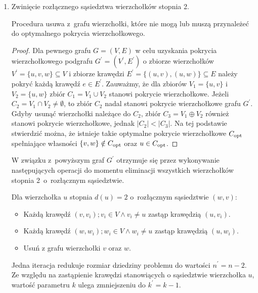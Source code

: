\begin{enumerate}
  \item Zwinięcie rozłącznego sąsiedztwa wierzchołków stopnia 2.
    \begin{theorem}
      Procedura usuwa z~grafu wierzchołki, które nie mogą lub muszą przynależeć do 
      optymalnego pokrycia wierzchołkowego.
    \end{theorem}
    \begin{proof}
      Dla pewnego grafu $G=(V,E)$ w celu uzyskania pokrycia wierzchołkowego podgrafu $G^\prime=(V^\prime,E^\prime)$ o zbiorze wierzchołków $V^\prime=\{u, v, w\} \subseteq V$ i zbiorze krawędzi $E^\prime=\{(u,v), (u,w)\} \subseteq E$ należy pokryć każdą krawędź $e \in E^\prime$. 
      Zauważmy, że dla zbiorów $V_1=\{u,v\}$ i $V_2=\{u,w\}$ zbiór $C_1=V_1 \cup V_2$ stanowi pokrycie wierzchołkowe.
      Jeżeli $C_2=V_1 \cap V_2 \neq \emptyset$, to zbiór $C_2$ nadal stanowi pokrycie wierzchołkowe grafu $G^\prime$.
      Gdyby usunąć wierzchołki należące do $C_2$, zbiór $C_3=V_1 \oplus V_2$ również stanowi pokrycie wierzchołkowe, jednak $|C_2| < |C_3|$.
      Na tej podstawie stwierdzić można, że istnieje takie optymalne pokrycie wierzchołkowe $C_{\textnormal{opt}}$ spełniające własności $\{v,w\} \notin C_{\textnormal{opt}}$ oraz $u \in C_{\textnormal{opt}}$.
    \end{proof}

    W związku z~powyższym graf $G^\prime$ otrzymuje się przez wykonywanie
    następujących operacji do momentu eliminacji wszystkich wierzchołków stopnia
    2\ o~rozłącznym sąsiedztwie.

    Dla wierzchołka $u$ stopnia $d(u)=2$ o~rozłącznym sąsiedztwie $(w,v)$:
    \begin{itemize}
      \item Każdą krawędź $(v,v_i); v_i \in V \land v_i \neq u$ zastąp 
        krawędzią $(u, v_i)$.
      \item Każdą krawędź $(w,w_i); w_i \in V \land w_i \neq u$ zastąp
        krawędzią $(u, w_i)$.
      \item Usuń z grafu wierzchołki $v$ oraz $w$.
    \end{itemize}
    Jedna iteracja redukuje rozmiar dziedziny problemu do wartości
    $n^\prime=n-2$.
    Ze względu na zastąpienie krawędzi stanowiących o sąsiedztwie wierzchołka $u$,
    wartość parametru $k$ ulega zmniejszeniu do $k^\prime=k-1$.

\end{enumerate}

